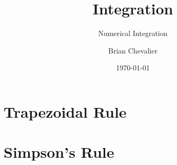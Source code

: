 \documentclass{../../KDHnotes}
\title{Integration}
\subtitle{Numerical Integration}
\author{Brian Chevalier}
\date{\today}
\begin{document}
\maketitle
\section{Trapezoidal Rule}




\section{Simpson's Rule}

\nocite{NumMethods}
\nocite{holisticnumericalmethods}

\newpage



\end{document}
